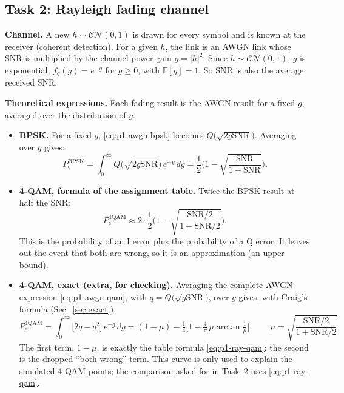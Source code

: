 \documentclass[11pt,a4paper]{article}
\newcommand{\snr}{\mathrm{SNR}}
\newcommand{\CN}{\mathcal{CN}}
\newcommand{\E}{\mathbb{E}}
\newcommand{\abs}[1]{\lvert #1 \rvert}
\newcommand{\Pe}{P_{\mathrm{e}}}
\begin{document}
\subsection{Task 2: Rayleigh fading channel}
\label{sec:p1-task2}

\textbf{Channel.} A new $h \sim \CN(0,1)$ is drawn for every symbol and is known at
the receiver (coherent detection). For a given $h$, the link is an AWGN link whose
SNR is multiplied by the channel power gain $g = \abs{h}^2$. Since $h \sim \CN(0,1)$,
$g$ is exponential, $f_g(g) = e^{-g}$ for $g \ge 0$, with $\E[g] = 1$. So $\snr$ is
also the average received SNR.

\textbf{Theoretical expressions.} Each fading result is the AWGN result for a fixed
$g$, averaged over the distribution of $g$.
\begin{itemize}
  \item \textbf{BPSK.} For a fixed $g$, \eqref{eq:p1-awgn-bpsk} becomes
        $Q\big(\sqrt{2g\snr}\big)$. Averaging over $g$ gives:
        \begin{equation}
          \Pe^{\mathrm{BPSK}} = \int_0^\infty Q\big(\sqrt{2g\snr}\big)\,e^{-g}\,dg
          = \frac12\Big(1 - \sqrt{\frac{\snr}{1+\snr}}\Big).
          \label{eq:p1-ray-bpsk}
        \end{equation}
  \item \textbf{4-QAM, formula of the assignment table.} Twice the BPSK result at half
        the SNR:
        \begin{equation}
          \Pe^{\mathrm{4QAM}} \approx 2\cdot\frac12\Big(1 - \sqrt{\frac{\snr/2}{1+\snr/2}}\Big).
          \label{eq:p1-ray-qam}
        \end{equation}
        This is the probability of an I error plus the probability of a Q error. It
        leaves out the event that both are wrong, so it is an approximation (an upper
        bound).
  \item \textbf{4-QAM, exact (extra, for checking).} Averaging the complete AWGN
        expression \eqref{eq:p1-awgn-qam}, with $q = Q\big(\sqrt{g\snr}\big)$, over $g$
        gives, with Craig's formula (Sec.~\ref{sec:exact}),
        \begin{equation}
          \Pe^{\mathrm{4QAM}} = \int_0^\infty \big[2q - q^2\big]\,e^{-g}\,dg
          = (1-\mu) - \tfrac14\Big[1 - \tfrac4\pi\,\mu\arctan\tfrac1\mu\Big],
          \qquad \mu = \sqrt{\frac{\snr/2}{1+\snr/2}} .
          \label{eq:p1-ray-exact}
        \end{equation}
        The first term, $1-\mu$, is exactly the table formula \eqref{eq:p1-ray-qam}; the
        second is the dropped ``both wrong'' term. This curve is only used to explain
        the simulated 4-QAM points; the comparison asked for in Task~2 uses
        \eqref{eq:p1-ray-qam}.
\end{itemize}
\end{document}
